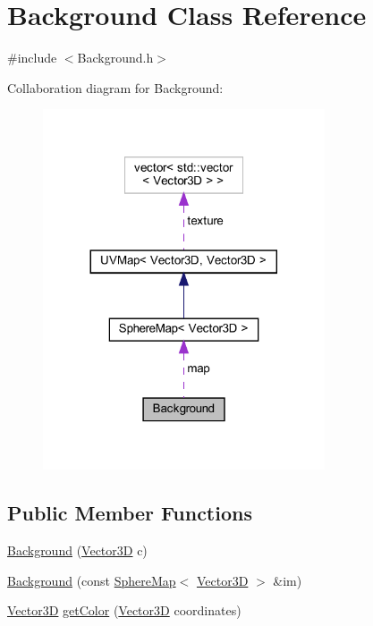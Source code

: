 \hypertarget{classBackground}{}\section{Background Class Reference}
\label{classBackground}


{\ttfamily \#include $<$Background.\+h$>$}



Collaboration diagram for Background\+:
\nopagebreak
\begin{figure}[H]
\begin{center}
\leavevmode
\includegraphics[width=236pt]{classBackground__coll__graph}
\end{center}
\end{figure}
\subsection*{Public Member Functions}
\begin{DoxyCompactItemize}
\item 
\mbox{\hyperlink{classBackground_a153fe3ce08c90c24e7d08862952a6244}{Background}} (\mbox{\hyperlink{classVector3D}{Vector3D}} c)
\item 
\mbox{\hyperlink{classBackground_a46cb4a8649d0d0535c916eea458c25de}{Background}} (const \mbox{\hyperlink{classSphereMap}{Sphere\+Map}}$<$ \mbox{\hyperlink{classVector3D}{Vector3D}} $>$ \&im)
\item 
\mbox{\hyperlink{classVector3D}{Vector3D}} \mbox{\hyperlink{classBackground_a901242466450821f487a1967d94c6506}{get\+Color}} (\mbox{\hyperlink{classVector3D}{Vector3D}} coordinates)
\end{DoxyCompactItemize}
